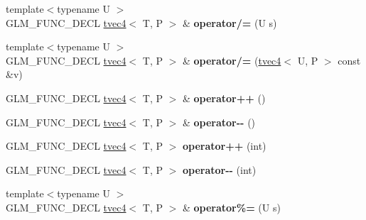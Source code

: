 \begin{DoxyCompactItemize}
\item 
{\footnotesize template$<$typename U $>$ }\\G\+L\+M\+\_\+\+F\+U\+N\+C\+\_\+\+D\+E\+CL \hyperlink{structglm_1_1detail_1_1tvec4}{tvec4}$<$ T, P $>$ \& {\bfseries operator/=} (U s)\hypertarget{structglm_1_1detail_1_1tvec4_a6228f03a4111e2d08f76f1707bfedc7f}{}\label{structglm_1_1detail_1_1tvec4_a6228f03a4111e2d08f76f1707bfedc7f}

\item 
{\footnotesize template$<$typename U $>$ }\\G\+L\+M\+\_\+\+F\+U\+N\+C\+\_\+\+D\+E\+CL \hyperlink{structglm_1_1detail_1_1tvec4}{tvec4}$<$ T, P $>$ \& {\bfseries operator/=} (\hyperlink{structglm_1_1detail_1_1tvec4}{tvec4}$<$ U, P $>$ const \&v)\hypertarget{structglm_1_1detail_1_1tvec4_a2a1dd4b855a28388c59c44cc72c932c7}{}\label{structglm_1_1detail_1_1tvec4_a2a1dd4b855a28388c59c44cc72c932c7}

\item 
G\+L\+M\+\_\+\+F\+U\+N\+C\+\_\+\+D\+E\+CL \hyperlink{structglm_1_1detail_1_1tvec4}{tvec4}$<$ T, P $>$ \& {\bfseries operator++} ()\hypertarget{structglm_1_1detail_1_1tvec4_aaa93930bcde2580185a474e508508ed2}{}\label{structglm_1_1detail_1_1tvec4_aaa93930bcde2580185a474e508508ed2}

\item 
G\+L\+M\+\_\+\+F\+U\+N\+C\+\_\+\+D\+E\+CL \hyperlink{structglm_1_1detail_1_1tvec4}{tvec4}$<$ T, P $>$ \& {\bfseries operator-\/-\/} ()\hypertarget{structglm_1_1detail_1_1tvec4_a207d975fb868347e3b1e320c71e8beeb}{}\label{structglm_1_1detail_1_1tvec4_a207d975fb868347e3b1e320c71e8beeb}

\item 
G\+L\+M\+\_\+\+F\+U\+N\+C\+\_\+\+D\+E\+CL \hyperlink{structglm_1_1detail_1_1tvec4}{tvec4}$<$ T, P $>$ {\bfseries operator++} (int)\hypertarget{structglm_1_1detail_1_1tvec4_a60d572f73f76dbdedd6b1a164f8aacaa}{}\label{structglm_1_1detail_1_1tvec4_a60d572f73f76dbdedd6b1a164f8aacaa}

\item 
G\+L\+M\+\_\+\+F\+U\+N\+C\+\_\+\+D\+E\+CL \hyperlink{structglm_1_1detail_1_1tvec4}{tvec4}$<$ T, P $>$ {\bfseries operator-\/-\/} (int)\hypertarget{structglm_1_1detail_1_1tvec4_a880ec39f85acc9bbac0fe842670bec57}{}\label{structglm_1_1detail_1_1tvec4_a880ec39f85acc9bbac0fe842670bec57}

\item 
{\footnotesize template$<$typename U $>$ }\\G\+L\+M\+\_\+\+F\+U\+N\+C\+\_\+\+D\+E\+CL \hyperlink{structglm_1_1detail_1_1tvec4}{tvec4}$<$ T, P $>$ \& {\bfseries operator\%=} (U s)\hypertarget{structglm_1_1detail_1_1tvec4_acaef893b94a3beafa931256d381efb42}{}\label{structglm_1_1detail_1_1tvec4_acaef893b94a3beafa931256d381efb42}


\end{DoxyCompactItemize}
